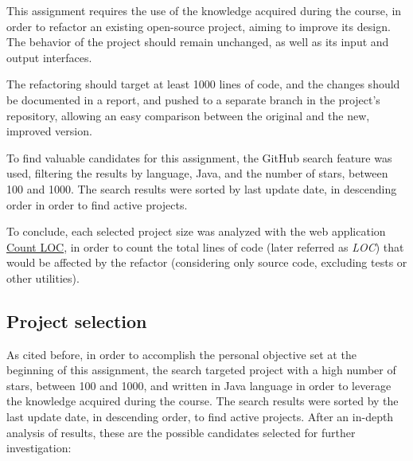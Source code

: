 This assignment requires the use of the knowledge acquired during the course, in order to refactor an existing open-source project, aiming to improve its design. The behavior of the project should remain unchanged, as well as its input and output interfaces.

The refactoring should target at least 1000 lines of code, and the changes should be documented in a report, and pushed to a separate branch in the project's repository, allowing an easy comparison between the original and the new, improved version.

To find valuable candidates for this assignment, the GitHub search feature was used, filtering the results by language, Java, and the number of stars, between 100 and 1000. The search results were sorted by last update date, in descending order in order to find active projects.

To conclude, each selected project size was analyzed with the web application \href{https://codetabs.com/count-loc/count-loc-online.html}{Count LOC}, in order to count the total lines of code (later referred as \emph{LOC}) that would be affected by the refactor (considering only source code, excluding tests or other utilities).

\subsection{Project selection}

As cited before, in order to accomplish the personal objective set at the beginning of this assignment, the search targeted project with a high number of stars, between 100 and 1000, and written in Java language in order to leverage the knowledge acquired during the course. The search results were sorted by the last update date, in descending order, to find active projects. After an in-depth analysis of results, these are the possible candidates selected for further investigation:

